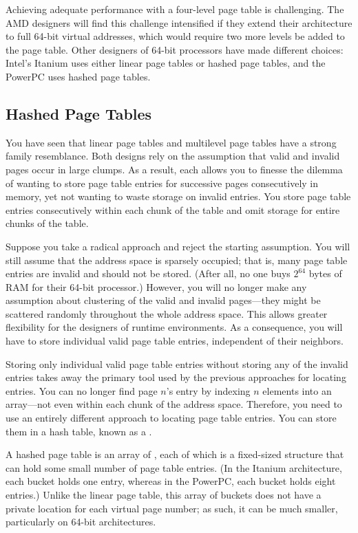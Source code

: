 Achieving adequate performance with a four-level page table is
challenging. The AMD designers will find this challenge intensified if
they extend their architecture to full 64-bit virtual addresses, which
would require two more levels be added to the page table.  Other
designers of 64-bit processors have made different choices: Intel's
Itanium uses either linear page tables or hashed page tables, and the
PowerPC uses hashed page tables.

\subsection{Hashed Page Tables}\label{hashed-page-tables-section}

You have seen that linear page tables and multilevel page tables have
a strong family resemblance.  Both designs rely on the assumption that valid
and invalid pages occur in large clumps.  As a result, each allows you to
finesse the dilemma of wanting to store page table entries for
successive pages consecutively in memory, yet not wanting to waste
storage on invalid entries.  You store page table entries
consecutively within each chunk of the table and omit storage for
entire chunks of the table.

Suppose you take a radical approach and reject the starting
assumption.  You will still assume that the address space is sparsely occupied;
that is, many page table entries are invalid and should not be stored.
(After all, no one buys $2^{64}$ bytes of RAM for their 64-bit
processor.)  However, you will no longer make any assumption about
clustering of the valid and invalid pages---they might be scattered
randomly throughout the whole address space.  This allows greater flexibility for the designers of
runtime environments.  As a consequence, you will have
to store individual valid page table entries, independent of their
neighbors.

Storing only individual valid page table entries without storing any
of the invalid entries takes away the primary tool used by the
previous approaches for locating
entries.  You can no longer find page $n$'s entry by indexing $n$
elements into an array---not even within each chunk of the address
space.  Therefore, you need to use an entirely different approach to
locating page table entries.  You can store them in a hash table, known
as a .

A hashed page table is an array of , each of
which is a fixed-sized structure that can hold some small number of
page table entries.  (In the Itanium architecture, each bucket holds
one entry, whereas in the PowerPC, each bucket holds eight entries.)
Unlike the linear page table, this array of buckets does not have a
private location for each virtual page number; as such, it can be much
smaller, particularly on 64-bit architectures.

